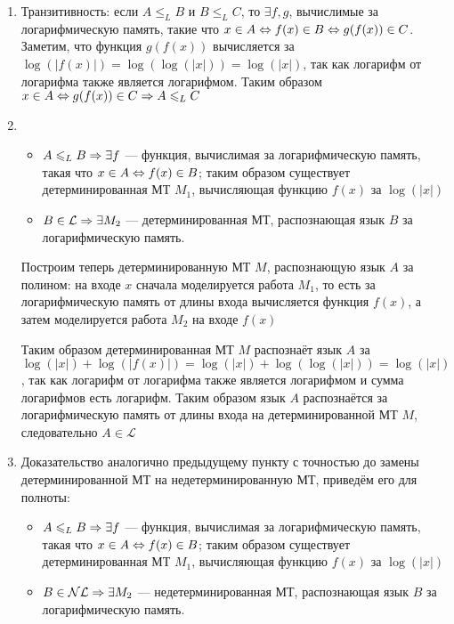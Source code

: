 \documentclass[a4paper,12pt]{article}
\begin{document}
\begin{solution}
	\begin{enumerate}
		\item Транзитивность: если $A\leq_L B$ и $B\leq_L C$, то $\exists f, g$, вычислимые за логарифмическую память, такие что $x \in A \Leftrightarrow f(x) \in B \Leftrightarrow g(f(x)) \in C$. Заметим, что функция $g(f(x))$ вычисляется за $\log(|f(x)|) = \log(\log(|x|)) = \log(|x|)$, так как логарифм от логарифма также является логарифмом. Таким образом $x \in A \Leftrightarrow g(f(x)) \in C \Rightarrow A \leqslant_L C$

		\item \begin{itemize}
			\item $A \leqslant_L B \Rightarrow \exists f$ --- функция, вычислимая за логарифмическую память, такая что $x \in A \Leftrightarrow f(x) \in B$; таким образом существует детерминированная МТ $M_1$, вычисляющая функцию $f(x)$ за $\log(|x|)$
			\item $B \in \mathcal{L} \Rightarrow \exists M_2$ --- детерминированная МТ, распознающая язык $B$ за логарифмическую память.
		\end{itemize}
		
		Построим теперь детерминированную МТ $M$, распознающую язык $A$ за полином: на входе $x$ сначала моделируется работа $M_1$, то есть за логарифмическую память от длины входа вычисляется функция $f(x)$, а затем моделируется работа $M_2$ на входе $f(x)$
		
		Таким образом детерминированная МТ $M$ распознаёт язык $A$ за $\log(|x|) + \log(|f(x)|) = \log(|x|) + \log(\log(|x|)) = \log(|x|)$, так как логарифм от логарифма также является логарифмом и сумма логарифмов есть логарифм. Таким образом язык $A$ распознаётся за логарифмическую память от длины входа на детерминированной МТ $M$, следовательно $A \in \mathcal{L}$
		
		\item Доказательство аналогично предыдущему пункту с точностью до замены детерминированной МТ на недетерминированную МТ, приведём его для полноты:
		
		 \begin{itemize}
			\item $A \leqslant_L B \Rightarrow \exists f$ --- функция, вычислимая за логарифмическую память, такая что $x \in A \Leftrightarrow f(x) \in B$; таким образом существует детерминированная МТ $M_1$, вычисляющая функцию $f(x)$ за $\log(|x|)$
			\item $B \in \mathcal{NL} \Rightarrow \exists M_2$ --- недетерминированная МТ, распознающая язык $B$ за логарифмическую память.
		\end{itemize}
		

\end{enumerate}
\end{solution}
\end{document}
